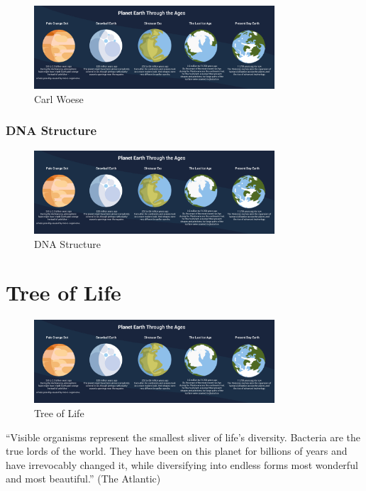 \documentclass[
]{book}
\begin{document}
\begin{figure}
\centering
\includegraphics[width=0.8\textwidth,height=\textheight]{./Figures/Planets.png}
\caption{Carl Woese}
\end{figure}

\hypertarget{dna-structure}{%
\subsubsection*{DNA Structure}\label{dna-structure}}

\begin{figure}
\centering
\includegraphics[width=0.8\textwidth,height=\textheight]{./Figures/Planets.png}
\caption{DNA Structure}
\end{figure}

\hypertarget{tree-of-life}{%
\section{Tree of Life}\label{tree-of-life}}

\begin{figure}
\centering
\includegraphics[width=0.8\textwidth,height=\textheight]{./Figures/Planets.png}
\caption{Tree of Life}
\end{figure}

``Visible organisms represent the smallest sliver of life's diversity. Bacteria are the true lords of the world. They have been on this planet for billions of years and have irrevocably changed it, while diversifying into endless forms most wonderful and most beautiful.'' (The Atlantic)
\end{document}
